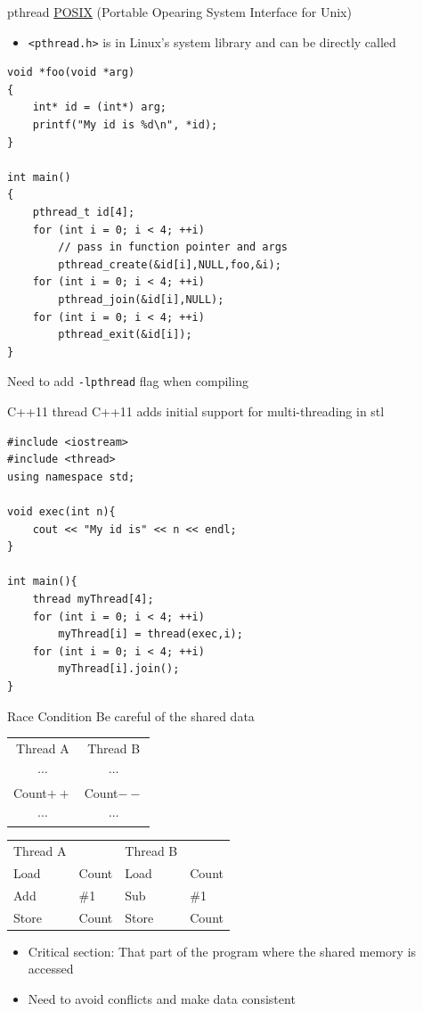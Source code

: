 \documentclass{../TexTemplate/myslide}
\begin{document}
\begin{frame}[fragile]{pthread}
\href{https://en.wikipedia.org/wiki/POSIX_Threads}{POSIX} (Portable Opearing System Interface for Unix)
\begin{itemize}
\item \verb'<pthread.h>' is in Linux's system library and can be directly called
\end{itemize}
\begin{lstlisting}[basicstyle=\scriptsize]
void *foo(void *arg)
{
	int* id = (int*) arg;
	printf("My id is %d\n", *id);
}

int main()
{
	pthread_t id[4];
	for (int i = 0; i < 4; ++i)
		// pass in function pointer and args
		pthread_create(&id[i],NULL,foo,&i);
	for (int i = 0; i < 4; ++i)
		pthread_join(&id[i],NULL);
	for (int i = 0; i < 4; ++i)
		pthread_exit(&id[i]);
}
\end{lstlisting}
Need to add \verb'-lpthread' flag when compiling
\end{frame}

\begin{frame}[fragile]{C++11 thread}
C++11 adds initial support for multi-threading in stl
\begin{lstlisting}
#include <iostream>
#include <thread>
using namespace std;

void exec(int n){
	cout << "My id is" << n << endl;
}

int main(){
	thread myThread[4];
	for (int i = 0; i < 4; ++i)
		myThread[i] = thread(exec,i);
	for (int i = 0; i < 4; ++i)
		myThread[i].join();
}
\end{lstlisting}
\end{frame}

\begin{frame}{Race Condition}
Be careful of the shared data
\begin{center}
\begin{tabular}{c|c}
Thread A & Thread B\\
$\cdots$ & $\cdots$\\
Count$++$ & Count$--$\\
$\cdots$ & $\cdots$
\end{tabular}\quad
\begin{tabular}{ll|ll}
Thread A & & Thread B\\
Load & Count & Load & Count\\
Add & \#1 & Sub & \#1\\
Store & Count & Store & Count
\end{tabular}
\end{center}
\begin{itemize}
	\item Critical section: That part of the program where the shared memory is accessed
	\item Need to avoid conflicts and make data consistent
\end{itemize}
\end{frame}
\end{document}

